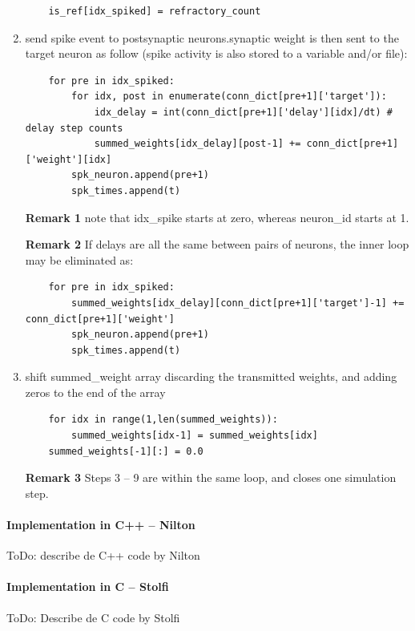 \documentclass[11pt]{scrartcl}
\begin{document}
\begin{enumerate}
\begin{verbatim}
    is_ref[idx_spiked] = refractory_count
\end{verbatim}
    \item send spike event to postsynaptic neurons.synaptic weight is then sent to the target neuron as follow (spike activity is also stored to a variable and/or file):
\begin{verbatim}
    for pre in idx_spiked:
        for idx, post in enumerate(conn_dict[pre+1]['target']):
            idx_delay = int(conn_dict[pre+1]['delay'][idx]/dt) # delay step counts
            summed_weights[idx_delay][post-1] += conn_dict[pre+1]['weight'][idx]
        spk_neuron.append(pre+1)
        spk_times.append(t)
\end{verbatim}
\textbf{Remark 1} note that idx\_spike starts at zero, whereas neuron\_id starts at 1.

\textbf{Remark 2} If delays are all the same between pairs of neurons, the inner loop may be eliminated as:
\begin{verbatim}
    for pre in idx_spiked:
        summed_weights[idx_delay][conn_dict[pre+1]['target']-1] += conn_dict[pre+1]['weight']
        spk_neuron.append(pre+1)
        spk_times.append(t)
\end{verbatim}
    \item shift summed\_weight array discarding the transmitted weights, and adding zeros to the end of the array
\begin{verbatim}
    for idx in range(1,len(summed_weights)):
        summed_weights[idx-1] = summed_weights[idx]
    summed_weights[-1][:] = 0.0
\end{verbatim}
\textbf{Remark 3} Steps 3 -- 9 are within the same loop, and closes one simulation step.
\end{enumerate}

\color{black}
\color{blue}
\paragraph{Implementation in C++ -- Nilton}

ToDo: describe de C++ code by Nilton

\paragraph{Implementation in C -- Stolfi}

ToDo: Describe de C code by Stolfi
\color{black}
\end{document}
